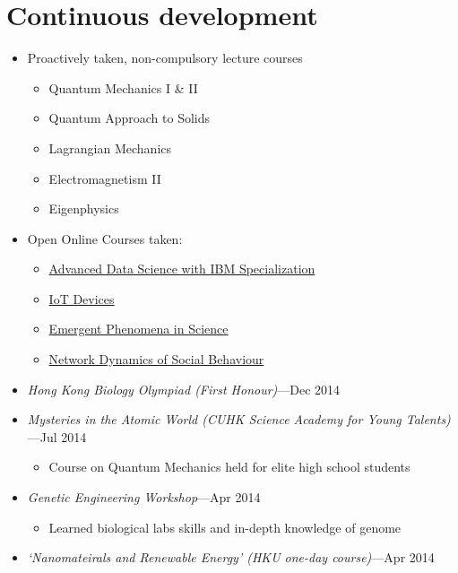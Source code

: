 \documentclass[a4paper, 12pt]{article}
\newcommand{\expentry}[3]{\emph{#1}\hfill{#2}---{#3}}
\begin{document}
\section{Continuous development}
\begin{itemize}
    \item Proactively taken, non-compulsory lecture courses
    \begin{itemize}
        \setlength\itemsep{0em}
        \item Quantum Mechanics I \& II
        \item Quantum Approach to Solids
        \item Lagrangian Mechanics
        \item Electromagnetism II
        \item Eigenphysics
    \end{itemize}
    \item Open Online Courses taken:
    \begin{itemize}
        \setlength\itemsep{0em}
        \item \href{https://www.coursera.org/specializations/advanced-data-science-ibm}{Advanced Data Science with IBM Specialization}
        \item \href{https://www.coursera.org/learn/iot-devices-il}{IoT Devices}
        \item \href{https://www.coursera.org/learn/emergent-phenomena}{Emergent Phenomena in Science}
        \item \href{https://www.coursera.org/learn/networkdynamics}{Network Dynamics of Social Behaviour}
    \end{itemize}
    \item \expentry{Hong Kong Biology Olympiad (First Honour)}{}{Dec 2014}
    \item \expentry{Mysteries in the Atomic World (CUHK Science Academy for Young Talents)}{}{Jul 2014}
    \begin{itemize}
        \item Course on Quantum Mechanics held for elite high school students
    \end{itemize}
    \item \expentry{Genetic Engineering Workshop}{}{Apr 2014}
    \begin{itemize}
        \item Learned biological labs skills and in-depth knowledge of genome
    \end{itemize}
    \item \expentry{`Nanomateirals and Renewable Energy' (HKU one-day course)}{}{Apr 2014}

\end{itemize}
\end{document}

